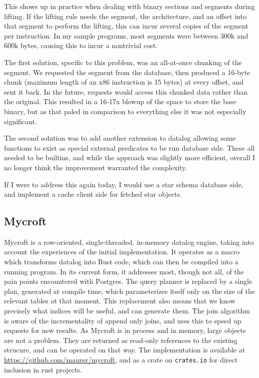 This shows up in practice when dealing with binary sections and segments during lifting.
If the lifting rule needs the segment, the architecture, and an offset into that segment to perform the lifting, this can incur several copies of the segment per instruction.
In my sample programs, most segments were between 300k and 600k bytes, causing this to incur a nontrivial cost.

The first solution, specific to this problem, was an all-at-once chunking of the segment.
We requested the segment from the database, then produced a 16-byte chunk (maximum length of an x86 instruction is 15 bytes) at every offset, and sent it back.
In the future, requests would access this chunked data rather than the original.
This resulted in a 16-17x blowup of the space to store the base binary, but as that paled in comparison to everything else it was not especially significant.

The second solution was to add another extension to datalog allowing some functions to exist as special external predicates to be run database side.
These all needed to be builtins, and while the approach was slightly more efficient, overall I no longer think the improvement warranted the complexity.

If I were to address this again today, I would use a star schema database side, and implement a cache client side for fetched star objects.

\subsection{Mycroft}
\label{sec:mycroft}
Mycroft is a row-oriented, single-threaded, in-memory datalog engine, taking into account the experiences of the initial implementation.
It operates as a macro which transforms datalog into Rust code, which can then be compiled into a running program.
In its current form, it addresses most, though not all, of the pain points encountered with Postgres.
The query planner is replaced by a single plan, generated at compile time, which parameterizes itself only on the size of the relevant tables at that moment.
This replacement also means that we know precisely what indices will be useful, and can generate them.
The join algorithm is aware of the incrementality of append only joins, and uses this to speed up requests for new results. 
As Mycroft is in process and in memory, large objects are not a problem.
They are returned as read-only references to the existing strucure, and can be operated on that way.
The implementation is available at \url{https://github.com/maurer/mycroft}, and as a crate on \texttt{crates.io} for direct inclusion in rust projects.

